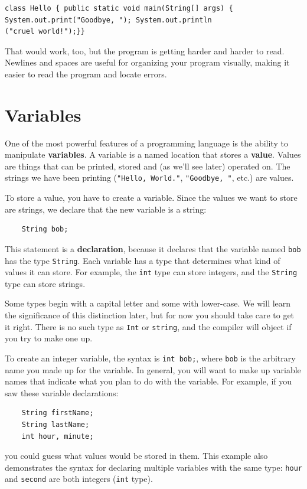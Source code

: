 \documentclass[12pt]{book}
\theoremstyle{exercise}
\begin{document}
\begin{lstlisting}
class Hello { public static void main(String[] args) {
System.out.print("Goodbye, "); System.out.println
("cruel world!");}}
\end{lstlisting}
%
That would work, too, but
the program is getting harder and harder to read.  Newlines and
spaces are useful for organizing your program visually, making
it easier to read the program and locate errors.


\section {Variables}

One of the most powerful features of a programming language is the
ability to manipulate {\bf variables}.  A variable is a named location
that stores a {\bf value}.  Values are things that can be printed, stored
and (as we'll see later) operated on.  The strings we have been
printing ({\tt "Hello, World."}, {\tt "Goodbye, "}, etc.)  are values.

To store a value, you have to create a variable.  Since
the values we want to store are strings, we declare that
the new variable is a string:

\begin{lstlisting}
    String bob;
\end{lstlisting}
%
This statement is a {\bf declaration}, because it declares that the
variable named {\tt bob} has the type {\tt String}.  Each variable
has a type that determines what kind of values it can store.  For
example, the {\tt int} type can store integers, and the {\tt String}
type can store strings.


Some types begin with a capital letter and some
with lower-case.  We will learn the significance of this distinction
later, but for now you should take care to get it right.  There is no
such type as {\tt Int} or {\tt string}, and the compiler will object
if you try to make one up.

To create an integer variable, the syntax is {\tt int bob;},
where {\tt bob} is the arbitrary name you made up for the
variable.  In general, you will want to make up variable names
that indicate what you plan to do with the variable.  For
example, if you saw these variable declarations:

\begin{lstlisting}
    String firstName;
    String lastName;
    int hour, minute;
\end{lstlisting}
%
you could guess what values
would be stored in them.  This example
also demonstrates the syntax for declaring multiple variables
with the same type: {\tt hour} and {\tt second}
are both integers ({\tt int} type).
\end{document}
